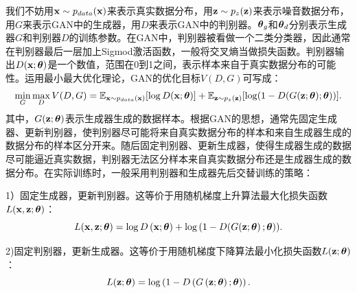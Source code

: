 我们不妨用$\mathbf{x}\sim p_{{data}}(\mathbf{x})$来表示真实数据分布，用$\mathbf{z}\sim p_{{z}}(\mathbf{z})$来表示噪音数据分布，用$G$来表示GAN中的生成器，用$D$来表示GAN中的判别器。$\mbox{\boldmath $\theta$}_{g}$和$\mbox{\boldmath $\theta$}_{d}$分别表示生成器$G$和判别器$D$的训练参数。在GAN中，判别器被看做一个二类分类器，因此通常在判别器最后一层加上Sigmod激活函数，一般将交叉熵当做损失函数。判别器输出$D(\mathbf{x};\mbox{\boldmath $\theta$})$是一个数值，范围在0到1之间，表示样本来自于真实数据分布的可能性。运用最小最大优化理论，GAN的优化目标$V(D, G)$可写成：
\begin{eqnarray}\label{equ:gan_loss_func}
\min _{G} \max _{D} V(D, G)=\mathbb{E}_{ \mathbf{x} \sim {p}_{ {data }}(\mathbf{x})}[\log D(\mathbf{x};\mbox{\boldmath $\theta$})]+\mathbb{E}_{\mathbf{z} \sim {p}_{{z}}(\mathbf{z})}[\log (1-D(G(\mathbf{z};\mbox{\boldmath $\theta$});\mbox{\boldmath $\theta$}))].
\end{eqnarray}
\noindent 其中，$G(\mathbf{z};\mbox{\boldmath $\theta$})$表示生成器生成的数据样本。根据GAN的思想，通常先固定生成器、更新判别器，使判别器尽可能将来自真实数据分布的样本和来自生成器生成的数据分布的样本区分开来。随后固定判别器、更新生成器，使得生成器生成的数据尽可能逼近真实数据，判别器无法区分样本来自真实数据分布还是生成器生成的数据分布。在实际训练时，一般采用判别器和生成器先后交替训练的策略：

1）固定生成器，更新判别器。这等价于用随机梯度上升算法最大化损失函数$L(\mathbf{x},\mathbf{z};\mbox{\boldmath $\theta$})$：
\begin{equation}
L(\mathbf{x},\mathbf{z};\mbox{\boldmath $\theta$})=\log D\left(\mathbf{x};\mbox{\boldmath $\theta$}\right)+\log \left(1-D(G(\mathbf{z};\mbox{\boldmath $\theta$}\right);\mbox{\boldmath $\theta$})).
\end{equation}
	
2)固定判别器，更新生成器。这等价于用随机梯度下降算法最小化损失函数$L(\mathbf{z};\mbox{\boldmath $\theta$})$：
	\begin{equation}
	L(\mathbf{z};\mbox{\boldmath $\theta$})=\log \left(1-D\left(G\left(\mathbf{z};\mbox{\boldmath $\theta$}\right);\mbox{\boldmath $\theta$}\right)\right).
	\end{equation}

